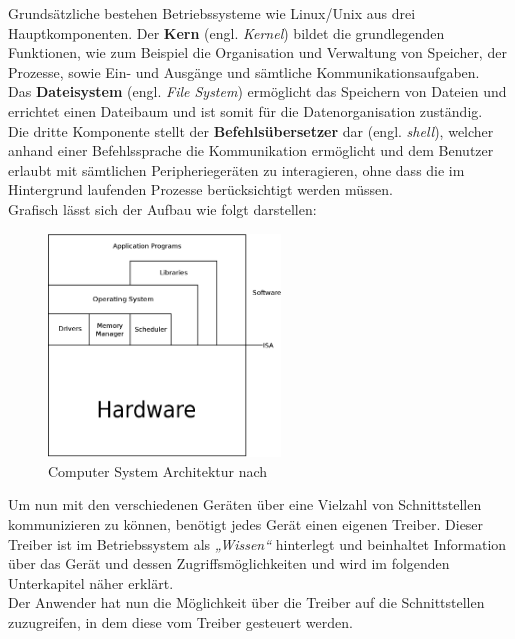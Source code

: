 Grundsätzliche bestehen Betriebssysteme wie Linux/Unix aus drei Hauptkomponenten.
Der \textbf{Kern} (engl. \emph{Kernel}) bildet die grundlegenden Funktionen, wie
zum Beispiel die Organisation und Verwaltung von Speicher, der Prozesse, sowie
Ein- und Ausgänge und sämtliche Kommunikationsaufgaben.\\
Das \textbf{Dateisystem} (engl. \emph{File System}) ermöglicht das Speichern von Dateien
und errichtet einen Dateibaum und ist somit für die Datenorganisation zuständig.\\
Die dritte Komponente stellt der \textbf{Befehlsübersetzer} dar (engl. \emph{shell}),
welcher anhand einer Befehlssprache die Kommunikation ermöglicht und dem Benutzer erlaubt
mit sämtlichen Peripheriegeräten zu interagieren, ohne dass die im Hintergrund laufenden
Prozesse berücksichtigt werden müssen. \cite{ubuntu}\\

Grafisch lässt sich der Aufbau wie folgt darstellen:\\

\begin{figure}[H]
\centering
\includegraphics[width=0.55\textwidth]{Hauptteil/csa.eps}
\caption{Computer System Architektur nach \cite{virtualmachines}}
\label{fig:mbs}
\end{figure}

Um nun mit den verschiedenen Geräten über eine Vielzahl von Schnittstellen kommunizieren
zu können, benötigt jedes Gerät einen eigenen Treiber. Dieser Treiber ist im Betriebssystem
als \emph{„Wissen“} hinterlegt und beinhaltet Information über das Gerät und dessen
Zugriffsmöglichkeiten und wird im folgenden Unterkapitel näher erklärt. \cite{treiber}\\
Der Anwender hat nun die Möglichkeit über die Treiber auf die Schnittstellen zuzugreifen, in dem diese vom
Treiber gesteuert werden.

